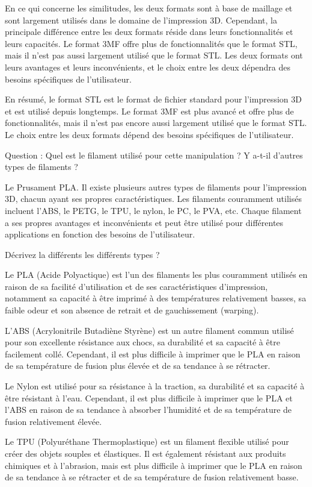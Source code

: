 \documentclass[12pt, letterpaper]{report}
\begin{document}
En ce qui concerne les similitudes, les deux formats sont à base de maillage et sont largement utilisés dans le domaine de l'impression 3D. Cependant, la principale différence entre les deux formats réside dans leurs fonctionnalités et leurs capacités. Le format 3MF offre plus de fonctionnalités que le format STL, mais il n'est pas aussi largement utilisé que le format STL. Les deux formats ont leurs avantages et leurs inconvénients, et le choix entre les deux dépendra des besoins spécifiques de l'utilisateur.

En résumé, le format STL est le format de fichier standard pour l'impression 3D et est utilisé depuis longtemps. Le format 3MF est plus avancé et offre plus de fonctionnalités, mais il n'est pas encore aussi largement utilisé que le format STL. Le choix entre les deux formats dépend des besoins spécifiques de l'utilisateur.

Question : Quel est le filament utilisé pour cette manipulation ? Y a-t-il d’autres types de filaments ?

Le Prusament PLA. Il existe plusieurs autres types de filaments pour l'impression 3D, chacun ayant ses propres caractéristiques. Les filaments couramment utilisés incluent l'ABS, le PETG, le TPU, le nylon, le PC, le PVA, etc. Chaque filament a ses propres avantages et inconvénients et peut être utilisé pour différentes applications en fonction des besoins de l'utilisateur.

Décrivez la différents les différents types ?

Le PLA (Acide Polyactique) est l'un des filaments les plus couramment utilisés en raison de sa facilité d'utilisation et de ses caractéristiques d'impression, notamment sa capacité à être imprimé à des températures relativement basses, sa faible odeur et son absence de retrait et de gauchissement (warping).

L'ABS (Acrylonitrile Butadiène Styrène) est un autre filament commun utilisé pour son excellente résistance aux chocs, sa durabilité et sa capacité à être facilement collé. Cependant, il est plus difficile à imprimer que le PLA en raison de sa température de fusion plus élevée et de sa tendance à se rétracter.

Le Nylon est utilisé pour sa résistance à la traction, sa durabilité et sa capacité à être résistant à l'eau. Cependant, il est plus difficile à imprimer que le PLA et l'ABS en raison de sa tendance à absorber l'humidité et de sa température de fusion relativement élevée.

Le TPU (Polyuréthane Thermoplastique) est un filament flexible utilisé pour créer des objets souples et élastiques. Il est également résistant aux produits chimiques et à l'abrasion, mais est plus difficile à imprimer que le PLA en raison de sa tendance à se rétracter et de sa température de fusion relativement basse.
\end{document}
